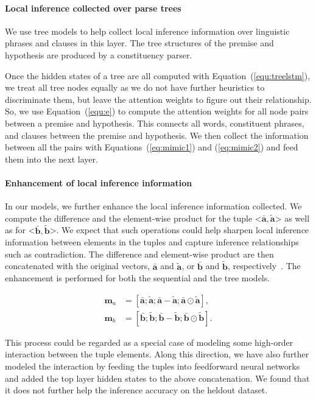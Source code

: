 \documentclass[11pt,a4paper]{article}
\newcommand{\vect}[1]{\mathbf{#1}}
\begin{document}
\paragraph{Local inference collected over parse trees}
We use tree models to help collect local inference information over linguistic phrases and clauses in this layer. 
The tree structures of the premise and hypothesis are produced by a constituency parser. 

Once the hidden states of a tree are all computed with Equation~(\ref{equ:treelstm}), we treat all tree nodes equally as we do not have further heuristics to discriminate them, but leave the attention weights to figure out their relationship. So, we use Equation~(\ref{equ:e}) to compute the attention weights for all node pairs between a premise and hypothesis. This connects all words, constituent phrases, and clauses between the premise and hypothesis. We then collect the information between all the pairs with Equations~(\ref{eq:mimic1}) and (\ref{eq:mimic2}) and feed them into the next layer.  

\paragraph{Enhancement of local inference information}
In our models, we further enhance the local inference information collected. We compute the difference and the element-wise product for the tuple <$\bar{\vect{a}}, \tilde{\vect{a}}$> as well as for <$\bar{\vect{b}}, \tilde{\vect{b}}$>. We expect that such operations could help sharpen local inference information between elements in the tuples and capture inference relationships such as contradiction. The difference and element-wise product are then concatenated with the original vectors, $\bar{\vect{a}}$ and $\tilde{\vect{a}}$, or $\bar{\vect{b}}$ and $\tilde{\vect{b}}$, respectively~\citep{Mou:P16-2022,Zhang:qa:2017}. The enhancement is performed for both the sequential and the tree models.

{\fontsize{10pt}{1.0cm}
	\begin{align}
		\vect{m}_a&=[\bar{\vect{a}}; \tilde{\vect{a}}; \bar{\vect{a}} - \tilde{\vect{a}}; \bar{\vect{a}} \odot \tilde{\vect{a}}], \\
		\vect{m}_b&=[\bar{\vect{b}}; \tilde{\vect{b}}; \bar{\vect{b}} - \tilde{\vect{b}}; \bar{\vect{b}} \odot \tilde{\vect{b}}].
	\end{align}
}

This process could be regarded as a special case of modeling some high-order interaction between the tuple elements. Along this direction, we have also further modeled the interaction by feeding the tuples into feedforward neural networks and added the top layer hidden states to the above concatenation. We found that it does not further help the inference accuracy on the heldout dataset. 
\end{document}
